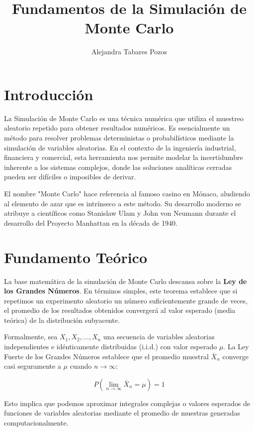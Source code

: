 \documentclass[11pt, letterpaper]{article}
\title{Fundamentos de la Simulación de Monte Carlo}
\author{Alejandra Tabares Pozos}
\date{}
\begin{document}
\maketitle
\tableofcontents
\newpage

\section{Introducción}

La Simulación de Monte Carlo es una técnica numérica que utiliza el muestreo aleatorio repetido para obtener resultados numéricos. Es esencialmente un método para resolver problemas deterministas o probabilísticos mediante la simulación de variables aleatorias. En el contexto de la ingeniería industrial, financiera y comercial, esta herramienta nos permite modelar la incertidumbre inherente a los sistemas complejos, donde las soluciones analíticas cerradas pueden ser difíciles o imposibles de derivar.

El nombre "Monte Carlo" hace referencia al famoso casino en Mónaco, aludiendo al elemento de azar que es intrínseco a este método. Su desarrollo moderno se atribuye a científicos como Stanislaw Ulam y John von Neumann durante el desarrollo del Proyecto Manhattan en la década de 1940.

\section{Fundamento Teórico}

La base matemática de la simulación de Monte Carlo descansa sobre la \textbf{Ley de los Grandes Números}. En términos simples, este teorema establece que si repetimos un experimento aleatorio un número suficientemente grande de veces, el promedio de los resultados obtenidos convergerá al valor esperado (media teórica) de la distribución subyacente.

Formalmente, sea $X_1, X_2, \dots, X_n$ una secuencia de variables aleatorias independientes e idénticamente distribuidas (i.i.d.) con valor esperado $\mu$. La Ley Fuerte de los Grandes Números establece que el promedio muestral $\bar{X}_n$ converge casi seguramente a $\mu$ cuando $n \to \infty$:

\begin{equation}
    P\left( \lim_{n \to \infty} \bar{X}_n = \mu \right) = 1
\end{equation}

Esto implica que podemos aproximar integrales complejas o valores esperados de funciones de variables aleatorias mediante el promedio de muestras generadas computacionalmente.
\end{document}
